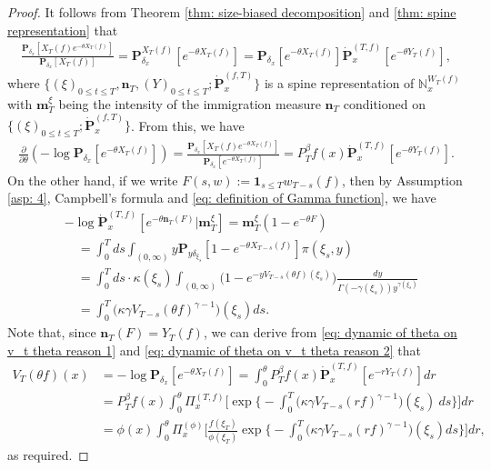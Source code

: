 \documentclass[UTF8]{pkuthss}
\theoremstyle{plain}
\theoremstyle{definition}
\numberwithin{equation}{section}
\begin{document}
\begin{proof}
	It follows from Theorem \ref{thm: size-biased decomposition} and \ref{thm: spine representation} that
\begin{align}
	\frac{ \mathbf P_{\delta_x}[X_T(f)e^{-\theta X_T(f)}] } {  \mathbf P_{\delta_x} [X_T(f)] }
	= \mathbf P_{\delta_x}^{X_T(f)} [e^{-\theta X_T(f)}]
	= \mathbf P_{\delta_x} [e^{-\theta X_T(f)}] \dot {\mathbf P}_x^{(T,f)}[e^{-\theta Y_T(f)}],
\end{align}
	where $\{(\xi)_{0\le t\le T}, \mathbf n_T, (Y)_{0\le t\le T}; \dot {\mathbf P}^{(f,T)}_x\}$ is a spine representation of $\mathbb N^{W_T(f)}_x$ with $\mathbf m^\xi_T$ being the intensity of the immigration measure $\mathbf n_T$ conditioned on $\{(\xi)_{0\le t\le T}; \dot {\mathbf P}^{(f,T)}_x\}$.
	From this, we have
\begin{align} \label{eq: dynamic of theta on v_t theta reason 1}
	\frac{\partial}{\partial \theta}
	(-\log \mathbf P_{\delta_x}[e^{-\theta X_T(f)}])
	= \frac{\mathbf P_{\delta_x}[X_T(f)e^{-\theta X_T(f)}]}{\mathbf P_{\delta_x}[e^{-\theta X_T(f)}]}
	= P^\beta_T f(x) \dot {\mathbf P}_x^{(T,f)}[e^{-\theta Y_T(f)}].
\end{align}
	On the other hand, if we write $F(s,w):= \mathbf 1_{s\leq T} w_{T-s}(f)$, then by Assumption \ref{asp: 4}, Campbell's formula and \eqref{eq: definition of Gamma function}, we have
\begin{align}\label{eq: dynamic of theta on v_t theta reason 2}
	&-\log \dot {\mathbf P}^{(T,f)}_{x}[e^{-\theta \mathbf n_T(F)}|\mathbf m_T^\xi]
	= \mathbf m_T^\xi(1-e^{-\theta F})
	\\&\quad = \int_0^T ds \int_{(0,\infty)} y \mathbf P_{y\delta_{\xi_s}}[1- e^{-\theta X_{T-s}(f)}] \pi(\xi_s,y)
	\\&\quad = \int_0^T ds \cdot \kappa(\xi_s) \int_{(0,\infty)} \mathbf (1- e^{- y V_{T-s}(\theta f)(\xi_s)}) \frac{dy}{\Gamma(-\gamma(\xi_s)) y^{\gamma(\xi_s)}}
	\\&\quad = \int_0^T \big(\kappa\gamma V_{T-s}(\theta f)^{\gamma-1}\big)(\xi_s) ds.
\end{align}
	Note that, since $\mathbf n_T(F)= Y_T(f)$, we can derive from \eqref{eq: dynamic of theta on v_t theta reason 1} and \eqref{eq: dynamic of theta on v_t theta reason 2} that
\begin{align}
	V_T(\theta f)(x)
	&= -\log \mathbf P_{\delta_x}[e^{-\theta X_T(f)}]
	= \int_0^\theta P^\beta_Tf(x)
	\dot {\mathbf P}_x^{(T,f)}[e^{-r  Y_T(f)}] dr
	\\&=P^\beta_Tf(x)\int_0^\theta \Pi_x^{(T,f)} \Big[\exp\Big\{-\int_0^T \big(\kappa\gamma V_{T-s}(r f)^{\gamma-1}\big)(\xi_s)~ds\Big\}\Big] dr
	\\&= \phi( x) \int_0^\theta \Pi_x^{(\phi)} \Big[ \frac{ f(\xi_T) } { \phi(\xi_T) } \exp\Big\{ - \int_0^T \big( \kappa \gamma V_{T-s} (r f)^{ \gamma - 1} \big) ( \xi_s) ds\Big\} \Big] dr,
\end{align}
	as required.
\end{proof}
\end{document}
